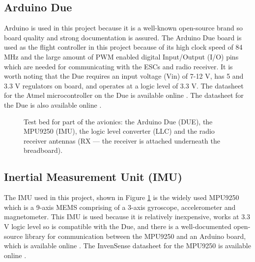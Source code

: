 \subsection*{Arduino Due}
Arduino is used in this project because it is a well-known open-source brand so board quality and strong documentation is assured. The Arduino Due board is used as the flight controller in this project because of its high clock speed of 84 \si{\mega\hertz} and the large amount of PWM enabled digital Input/Output (I/O) pins which are needed for communicating with the ESCs and radio receiver. It is worth noting that the Due requires an input voltage (Vin) of 7-12 \si{\volt}, has 5 and 3.3 \si{\volt} regulators on board, and operates at a logic level of 3.3 \si{\volt}. The datasheet for the Atmel microcontroller on the Due is available online \cite{atmel_datasheet}. The datasheet for the Due is also available online \cite{due_datasheet}.

\begin{figure}[htpb!]
    \centering
    \caption{Test bed for part of the avionics: the Arduino Due (DUE), the MPU9250 (IMU), the logic level converter (LLC) and the radio receiver antennas (RX --- the receiver is attached underneath the breadboard).}
    \label{fig:breadboard}
\end{figure}



\subsection*{Inertial Measurement Unit (IMU)} 
The IMU used in this project, shown in Figure \ref{fig:breadboard} is the widely used MPU9250 \cite{} which is a 9-axis \ac{MEMS} comprising of a 3-axis gyroscope, accelerometer and magnetometer. This IMU is used because it is relatively inexpensive, works at 3.3 \si{\volt} logic level so is compatible with the Due, and there is a well-documented open-source library for communication between the MPU9250 and an Arduino board, which is available online \cite{MPU9250_library}. The InvenSense datasheet for the MPU9250 is available online \cite{imu_datasheet}.




